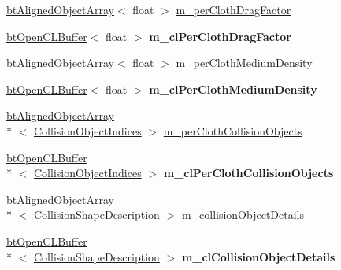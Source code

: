 \begin{DoxyCompactItemize}
\item 
\hyperlink{classbt_aligned_object_array}{bt\+Aligned\+Object\+Array}$<$ float $>$ \hyperlink{classbt_open_c_l_soft_body_solver_af40a572125daa262d4b6ef7fe056556c}{m\+\_\+per\+Cloth\+Drag\+Factor}
\item 
\hypertarget{classbt_open_c_l_soft_body_solver_a9a5da91c0465487c324abe03d782bcbf}{\hyperlink{classbt_open_c_l_buffer}{bt\+Open\+C\+L\+Buffer}$<$ float $>$ {\bfseries m\+\_\+cl\+Per\+Cloth\+Drag\+Factor}}\label{classbt_open_c_l_soft_body_solver_a9a5da91c0465487c324abe03d782bcbf}

\item 
\hyperlink{classbt_aligned_object_array}{bt\+Aligned\+Object\+Array}$<$ float $>$ \hyperlink{classbt_open_c_l_soft_body_solver_ad2bd63fa81b2941bf79b8edee6cb9791}{m\+\_\+per\+Cloth\+Medium\+Density}
\item 
\hypertarget{classbt_open_c_l_soft_body_solver_a812a573eb0721019f2001cd04a8aae60}{\hyperlink{classbt_open_c_l_buffer}{bt\+Open\+C\+L\+Buffer}$<$ float $>$ {\bfseries m\+\_\+cl\+Per\+Cloth\+Medium\+Density}}\label{classbt_open_c_l_soft_body_solver_a812a573eb0721019f2001cd04a8aae60}

\item 
\hyperlink{classbt_aligned_object_array}{bt\+Aligned\+Object\+Array}\\*
$<$ \hyperlink{structbt_open_c_l_soft_body_solver_1_1_collision_object_indices}{Collision\+Object\+Indices} $>$ \hyperlink{classbt_open_c_l_soft_body_solver_a01356688ec3d99fe305ee2e70cf884d1}{m\+\_\+per\+Cloth\+Collision\+Objects}
\item 
\hypertarget{classbt_open_c_l_soft_body_solver_acd3b20c8503218ad6982d692210fcfb7}{\hyperlink{classbt_open_c_l_buffer}{bt\+Open\+C\+L\+Buffer}\\*
$<$ \hyperlink{structbt_open_c_l_soft_body_solver_1_1_collision_object_indices}{Collision\+Object\+Indices} $>$ {\bfseries m\+\_\+cl\+Per\+Cloth\+Collision\+Objects}}\label{classbt_open_c_l_soft_body_solver_acd3b20c8503218ad6982d692210fcfb7}

\item 
\hyperlink{classbt_aligned_object_array}{bt\+Aligned\+Object\+Array}\\*
$<$ \hyperlink{struct_collision_shape_description}{Collision\+Shape\+Description} $>$ \hyperlink{classbt_open_c_l_soft_body_solver_a686543041f61bec0aba0e0e03db363fe}{m\+\_\+collision\+Object\+Details}
\item 
\hypertarget{classbt_open_c_l_soft_body_solver_af0f998d0815086e4c3f299af1c9bf422}{\hyperlink{classbt_open_c_l_buffer}{bt\+Open\+C\+L\+Buffer}\\*
$<$ \hyperlink{struct_collision_shape_description}{Collision\+Shape\+Description} $>$ {\bfseries m\+\_\+cl\+Collision\+Object\+Details}}\label{classbt_open_c_l_soft_body_solver_af0f998d0815086e4c3f299af1c9bf422}


\end{DoxyCompactItemize}
